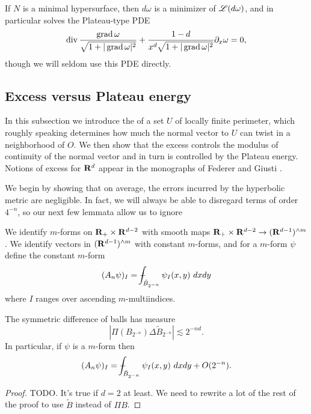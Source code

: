 If $N$ is a minimal hypersurface, then $d\omega$ is a minimizer of $\mathscr L(d\omega)$, and in particular solves the Plateau-type PDE 
\begin{equation}\label{Plateau PDE}
    \operatorname{div} \frac{\operatorname{grad} \omega}{\sqrt{1 + |\operatorname{grad} \omega|^2}} + \frac{1 - d}{x^d \sqrt{1 + |\operatorname{grad} \omega|^2}} \partial_x \omega = 0,
\end{equation}
though we will seldom use this PDE directly.


\subsection{Excess versus Plateau energy}
In this subsection we introduce the  of a set $U$ of locally finite perimeter, which roughly speaking determines how much the normal vector to $U$ can twist in a neighborhood of $O$.
We then show that the excess controls the modulus of continuity of the normal vector and in turn is controlled by the Plateau energy.
Notions of excess for $\mathbf{R}^d$ appear in the monographs of Federer \cite[\S5.3.1]{federer2014geometric} and Giusti \cite[Chapter 6]{Giusti77}.

We begin by showing that on average, the errors incurred by the hyperbolic metric are negligible.
In fact, we will always be able to disregard terms of order $4^{-n}$, so our next few lemmata allow us to ignore 

\begin{notation}
We identify $m$-forms on $\mathbf{R}_+ \times \mathbf{R}^{d - 2}$ with smooth maps $\mathbf{R}_+ \times \mathbf{R}^{d - 2} \to (\mathbf{R}^{d - 1})^{\wedge m}$.
We identify vectors in $(\mathbf{R}^{d - 1})^{\wedge m}$ with constant $m$-forms, and for a $m$-form $\psi$ define the constant $m$-form
$$(A_n \psi)_I = \dashint_{\tilde B_{2^{-n}}} \psi_I(x, y) ~dxdy$$
where $I$ ranges over ascending $m$-multiindices.
\end{notation}

\begin{lemma}\label{ball difference is harmless}
The symmetric difference of balls has measure 
$$|\Pi(B_{2^{-n}}) \Delta \tilde B_{2^{-n}}| \lesssim 2^{-nd}.$$
In particular, if $\psi$ is a $m$-form then 
$$(A_n \psi)_I = \dashint_{\tilde B_{2^{-n}}} \psi_I(x, y) ~dxdy + O(2^{-n}).$$
\end{lemma}
\begin{proof}
TODO. It's true if $d = 2$ at least. We need to rewrite a lot of the rest of the proof to use $\tilde B$ instead of $\Pi B$.
\end{proof}

